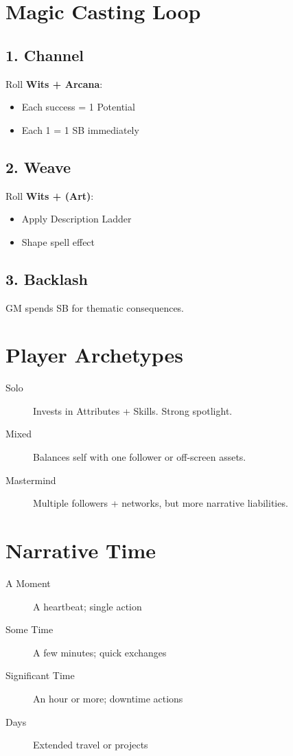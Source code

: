 \section{Magic Casting Loop}

\subsection*{1. Channel}
Roll \textbf{Wits + Arcana}:
\begin{itemize}
  \item Each success = 1 Potential
  \item Each 1 = 1 SB immediately
\end{itemize}

\subsection*{2. Weave}
Roll \textbf{Wits + (Art)}:
\begin{itemize}
  \item Apply Description Ladder
  \item Shape spell effect
\end{itemize}

\subsection*{3. Backlash}
GM spends SB for thematic consequences.

\section{Player Archetypes}

\begin{description}
  \item[Solo] Invests in Attributes + Skills. Strong spotlight.
  \item[Mixed] Balances self with one follower or off-screen assets.
  \item[Mastermind] Multiple followers + networks, but more narrative liabilities.
\end{description}

\section{Narrative Time}

\begin{description}
  \item[A Moment] A heartbeat; single action
  \item[Some Time] A few minutes; quick exchanges
  \item[Significant Time] An hour or more; downtime actions
  \item[Days] Extended travel or projects
\end{description}


